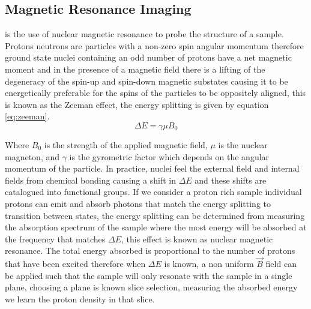 


\subsection{Magnetic Resonance Imaging}
\mri is the use of nuclear magnetic resonance to probe the structure of a sample. Protons neutrons are particles with a non-zero spin angular momentum therefore ground state nuclei containing an odd number of protons have a net magnetic moment and in the presence of a magnetic field there is a lifting of the degeneracy of the spin-up and spin-down magnetic substates causing it to be energetically preferable for the spins of the particles to be oppositely aligned, this is known as the Zeeman effect, the energy splitting is given by equation \ref{eq:zeeman}.
\begin{equation}
    \Delta E = \gamma \mu B_0
    \label{eq:zeeman}
\end{equation}

Where $B_0$ is the strength of the applied magnetic field, $\mu$ is the nuclear magneton, and $\gamma$ is the gyrometric factor which depends on the angular momentum of the particle. \cite{griffiths2005introduction} In practice, nuclei feel the external field and internal fields from chemical bonding causing a shift in $\Delta E$ and these shifts are catalogued into functional groups. If we consider a proton rich sample individual protons can emit and absorb photons that match the energy splitting to transition between states, the energy splitting can be determined from measuring the absorption spectrum of the sample where the most energy will be absorbed at the frequency that matches $\Delta E$, this effect is known as nuclear magnetic resonance. \cite{bushberg2011essential} The total energy absorbed is proportional to the number of protons that have been excited therefore when $\Delta E$ is known, a non uniform $\vec{B}$ field can be applied such that the sample will only resonate with the sample in a single plane, choosing a plane is known slice selection, measuring the absorbed energy we learn the proton density in that slice.

